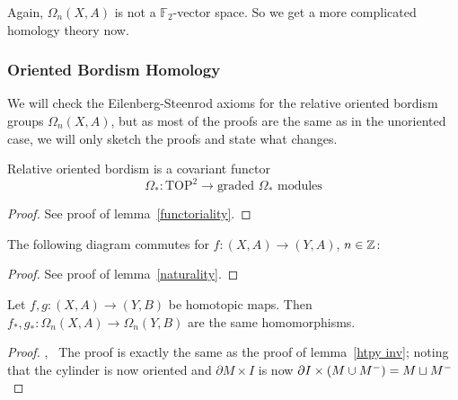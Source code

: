 \documentclass[a4paper,11pt]{article}
\begin{document}
Again, \(\Omega_n(X,A)\) is not a \(\mathbb{F}_2\)-vector space. So we get a more complicated homology theory now.

\subsubsection{Oriented Bordism Homology}\label{Kap Oriented Bordism Homology}
We will check the Eilenberg-Steenrod axioms for the relative oriented bordism groups \(\Omega_n(X,A)\), but as most of the proofs are the same as in the unoriented case, we will only sketch the proofs and state what changes.

\begin{lemma}
    Relative oriented bordism is a covariant functor
    \[\Omega_\ast:\mathrm{TOP}^2\to\text{graded }\Omega_\ast\text{ modules}\]
\end{lemma}

\begin{proof}
    See proof of lemma\ \ref{functoriality}.
\end{proof}

\begin{lemma}
    The following diagram commutes for \(f:(X,A)\to(Y,A)\), \(n\in\mathbb{Z}\):
    \begin{center}
    \end{center}
\end{lemma}

\begin{proof}
    See proof of lemma\ \ref{naturality}.
\end{proof}

\begin{lemma}
    Let \(f,g:(X,A)\to(Y,B)\) be homotopic maps. Then \(f_\ast,g_\ast:\Omega_n(X,A)\to\Omega_n(Y,B)\) are the same homomorphisms.
\end{lemma}

\begin{proof}\cite{atiyah},\ \cite{conner}
    The proof is exactly the same as the proof of lemma\ \ref{htpy inv}; noting that the cylinder is now oriented and \(\partial M\times I\) is now \(\partial I\times (M\cup M^-)=M\sqcup M^-\)%
\end{proof}
\end{document}
